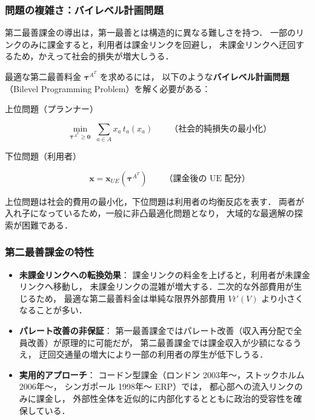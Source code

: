\subsubsection*{問題の複雑さ：バイレベル計画問題}

第二最善課金の導出は，第一最善とは構造的に異なる難しさを持つ．
一部のリンクのみに課金すると，利用者は課金リンクを回避し，
未課金リンクへ迂回するため，かえって社会的損失が増大しうる\cite{Sheffi1985}．

最適な第二最善料金 $\boldsymbol{\tau}^{A^T}$ を求めるには，
以下のような\textbf{バイレベル計画問題}（Bilevel Programming Problem）を解く必要がある：

\begin{description}
  \item[上位問題（プランナー）]
    \begin{equation}
      \min_{\boldsymbol{\tau}^{A^T} \geq \mathbf{0}}\;
      \sum_{a \in A} x_a\, t_a(x_a)
      \qquad \text{（社会的純損失の最小化）}
      \label{eq:second-best-upper}
    \end{equation}
  \item[下位問題（利用者）]
    \begin{equation}
      \boldsymbol{x} = \boldsymbol{x}_{UE}(\boldsymbol{\tau}^{A^T})
      \qquad \text{（課金後の UE 配分）}
      \label{eq:second-best-lower}
    \end{equation}
\end{description}

上位問題は社会的費用の最小化，下位問題は利用者の均衡反応を表す．
両者が入れ子になっているため，一般に非凸最適化問題となり，
大域的な最適解の探索が困難である\cite{Sheffi1985}．

\subsubsection*{第二最善課金の特性}

\begin{itemize}
  \item \textbf{未課金リンクへの転換効果}：
        課金リンクの料金を上げると，利用者が未課金リンクへ移動し，
        未課金リンクの混雑が増大する．二次的な外部費用が生じるため，
        最適な第二最善料金は単純な限界外部費用 $V t'(V)$ より小さくなることが多い．

  \item \textbf{パレート改善の非保証}：
        第一最善課金ではパレート改善（収入再分配で全員改善）が原理的に可能だが，
        第二最善課金では課金収入が少額になるうえ，
        迂回交通量の増大により一部の利用者の厚生が低下しうる．

  \item \textbf{実用的アプローチ}：
        コードン型課金（ロンドン 2003年〜，ストックホルム 2006年〜，
        シンガポール 1998年〜 ERP）では，
        都心部への流入リンクのみに課金し，
        外部性全体を近似的に内部化するとともに政治的受容性を確保している\cite{Vickrey1969}．
\end{itemize}

